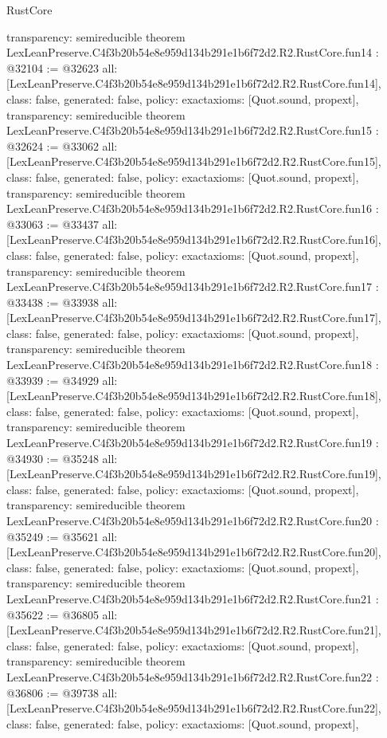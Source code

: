 \begin{lexlean}{RustCore}
\begin{coremodule}
{  transparency: semireducible
}
theorem LexLeanPreserve.C4f3b20b54e8e959d134b291e1b6f72d2.R2.RustCore.fun14 : @32104 := @32623 {
  all: [LexLeanPreserve.C4f3b20b54e8e959d134b291e1b6f72d2.R2.RustCore.fun14],
  class: false,
  generated: false,
  policy: exact{axioms: [Quot.sound, propext]},
  transparency: semireducible
}
theorem LexLeanPreserve.C4f3b20b54e8e959d134b291e1b6f72d2.R2.RustCore.fun15 : @32624 := @33062 {
  all: [LexLeanPreserve.C4f3b20b54e8e959d134b291e1b6f72d2.R2.RustCore.fun15],
  class: false,
  generated: false,
  policy: exact{axioms: [Quot.sound, propext]},
  transparency: semireducible
}
theorem LexLeanPreserve.C4f3b20b54e8e959d134b291e1b6f72d2.R2.RustCore.fun16 : @33063 := @33437 {
  all: [LexLeanPreserve.C4f3b20b54e8e959d134b291e1b6f72d2.R2.RustCore.fun16],
  class: false,
  generated: false,
  policy: exact{axioms: [Quot.sound, propext]},
  transparency: semireducible
}
theorem LexLeanPreserve.C4f3b20b54e8e959d134b291e1b6f72d2.R2.RustCore.fun17 : @33438 := @33938 {
  all: [LexLeanPreserve.C4f3b20b54e8e959d134b291e1b6f72d2.R2.RustCore.fun17],
  class: false,
  generated: false,
  policy: exact{axioms: [Quot.sound, propext]},
  transparency: semireducible
}
theorem LexLeanPreserve.C4f3b20b54e8e959d134b291e1b6f72d2.R2.RustCore.fun18 : @33939 := @34929 {
  all: [LexLeanPreserve.C4f3b20b54e8e959d134b291e1b6f72d2.R2.RustCore.fun18],
  class: false,
  generated: false,
  policy: exact{axioms: [Quot.sound, propext]},
  transparency: semireducible
}
theorem LexLeanPreserve.C4f3b20b54e8e959d134b291e1b6f72d2.R2.RustCore.fun19 : @34930 := @35248 {
  all: [LexLeanPreserve.C4f3b20b54e8e959d134b291e1b6f72d2.R2.RustCore.fun19],
  class: false,
  generated: false,
  policy: exact{axioms: [Quot.sound, propext]},
  transparency: semireducible
}
theorem LexLeanPreserve.C4f3b20b54e8e959d134b291e1b6f72d2.R2.RustCore.fun20 : @35249 := @35621 {
  all: [LexLeanPreserve.C4f3b20b54e8e959d134b291e1b6f72d2.R2.RustCore.fun20],
  class: false,
  generated: false,
  policy: exact{axioms: [Quot.sound, propext]},
  transparency: semireducible
}
theorem LexLeanPreserve.C4f3b20b54e8e959d134b291e1b6f72d2.R2.RustCore.fun21 : @35622 := @36805 {
  all: [LexLeanPreserve.C4f3b20b54e8e959d134b291e1b6f72d2.R2.RustCore.fun21],
  class: false,
  generated: false,
  policy: exact{axioms: [Quot.sound, propext]},
  transparency: semireducible
}
theorem LexLeanPreserve.C4f3b20b54e8e959d134b291e1b6f72d2.R2.RustCore.fun22 : @36806 := @39738 {
  all: [LexLeanPreserve.C4f3b20b54e8e959d134b291e1b6f72d2.R2.RustCore.fun22],
  class: false,
  generated: false,
  policy: exact{axioms: [Quot.sound, propext]},
}
\end{coremodule}
\end{lexlean}
